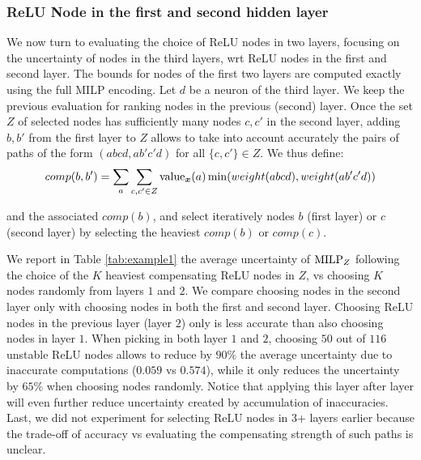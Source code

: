 \subsubsection*{ReLU Node in the first and second hidden layer}

We now turn to evaluating the choice of ReLU nodes in two layers, focusing on the uncertainty of nodes in the third layers, wrt ReLU nodes in the first and second layer.
The bounds for nodes of the first two layers are computed exactly using the full MILP encoding. Let $d$ be a neuron of the third layer.
We keep the previous evaluation for ranking nodes in the previous (second) layer. 
Once the set $Z$ of selected nodes has sufficiently many nodes $c,c'$ in the second layer, adding $b,b'$ from the first layer to $Z$ allows to take into account accurately the pairs of paths of the form $(a b c d, a b' c' d)$ for all $\{c,c'\} \in Z$. We thus define:
\vspace{-0.2cm}
$$comp(b,b')=\sum_a \sum_{c,c' \in Z} {\textrm{value}}_{\boldsymbol{x}}(a) \min( weight(abcd),weight(ab'c'd))$$ 
\vspace{-0.2cm}

and the associated $comp(b)$, and select iteratively nodes $b$ (first layer) or $c$ (second layer) by selecting the heaviest $comp(b)$ or $comp(c)$.

We report in Table \ref{tab:example1} the average uncertainty of ${\textrm{MILP}}_Z$ following the choice of the $K$ heaviest compensating ReLU nodes in $Z$, vs choosing $K$ nodes randomly from layers $1$ and $2$. 
We compare choosing nodes in the second layer only with choosing nodes in both the first and second layer.
Choosing ReLU nodes in the previous layer (layer $2$) only is less accurate than 
also choosing nodes in layer $1$. When picking in both layer $1$ and $2$, choosing $50$ out of $116$ unstable ReLU nodes allows to reduce by $90\%$ the average uncertainty due to inaccurate computations ($0.059$ vs $0.574$), while it only reduces the uncertainty by $65\%$ when choosing nodes randomly. Notice that applying this layer after layer will even further reduce uncertainty created by accumulation of inaccuracies. 
Last, we did not experiment for selecting ReLU nodes in 3+ layers earlier because the trade-off of accuracy vs evaluating the compensating strength of such paths is unclear.

